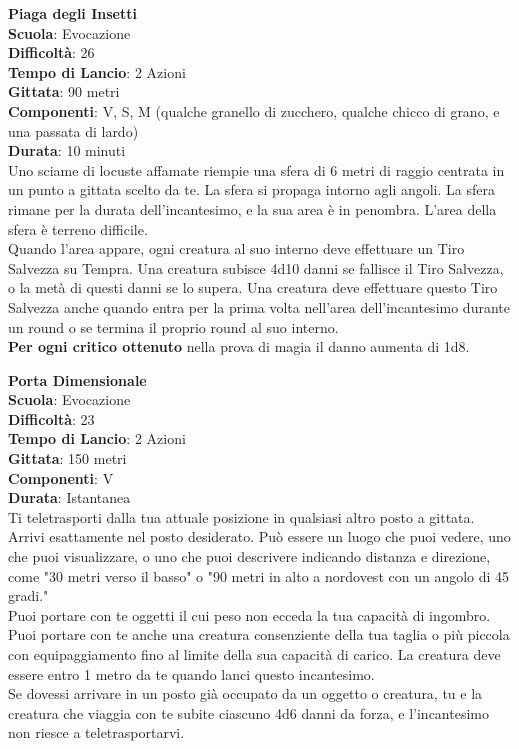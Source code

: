 \begin{multicols}{2}
\medskip\textbf{Piaga degli Insetti}\\
\textbf{Scuola}: Evocazione\\
\textbf{Difficoltà}: 26\\
\textbf{Tempo di Lancio}: 2 Azioni\\
\textbf{Gittata}: 90 metri\\
\textbf{Componenti}: V, S, M (qualche granello di zucchero, qualche chicco di grano, e una passata di lardo)\\
\textbf{Durata}: 10 minuti\\
Uno sciame di locuste affamate riempie una sfera di 6 metri di raggio centrata in un punto a gittata scelto da te. La sfera si propaga intorno agli angoli. La sfera rimane per la durata dell'incantesimo, e la sua area è in penombra. L'area della sfera è terreno difficile.\\
Quando l'area appare, ogni creatura al suo interno deve effettuare un Tiro Salvezza su Tempra. Una creatura subisce 4d10 danni se fallisce il Tiro Salvezza, o la metà di questi danni se lo supera. Una creatura deve effettuare questo Tiro Salvezza anche quando entra per la prima volta nell'area dell'incantesimo durante un round o se termina il proprio round al suo interno.\\
\textbf{Per ogni critico ottenuto} nella prova di magia il danno aumenta di 1d8.

\medskip\textbf{Porta Dimensionale}\\
\textbf{Scuola}: Evocazione\\
\textbf{Difficoltà}: 23\\
\textbf{Tempo di Lancio}: 2 Azioni\\
\textbf{Gittata}: 150 metri\\
\textbf{Componenti}: V\\
\textbf{Durata}: Istantanea\\
Ti teletrasporti dalla tua attuale posizione in qualsiasi altro posto a gittata. Arrivi esattamente nel posto desiderato. Può essere un luogo che puoi vedere, uno che puoi visualizzare, o uno che puoi descrivere indicando distanza e direzione, come "30 metri verso il basso" o "90 metri in alto a nordovest con un angolo di 45 gradi."\\
Puoi portare con te oggetti il cui peso non ecceda la tua capacità di ingombro. Puoi portare con te anche una creatura consenziente della tua taglia o più piccola con equipaggiamento fino al limite della sua capacità di carico. La creatura deve essere entro 1 metro da te quando lanci questo incantesimo. \\
Se dovessi arrivare in un posto già occupato da un oggetto o creatura, tu e la creatura che viaggia con te subite ciascuno 4d6 danni da forza, e l'incantesimo non riesce a teletrasportarvi.


\end{multicols}
